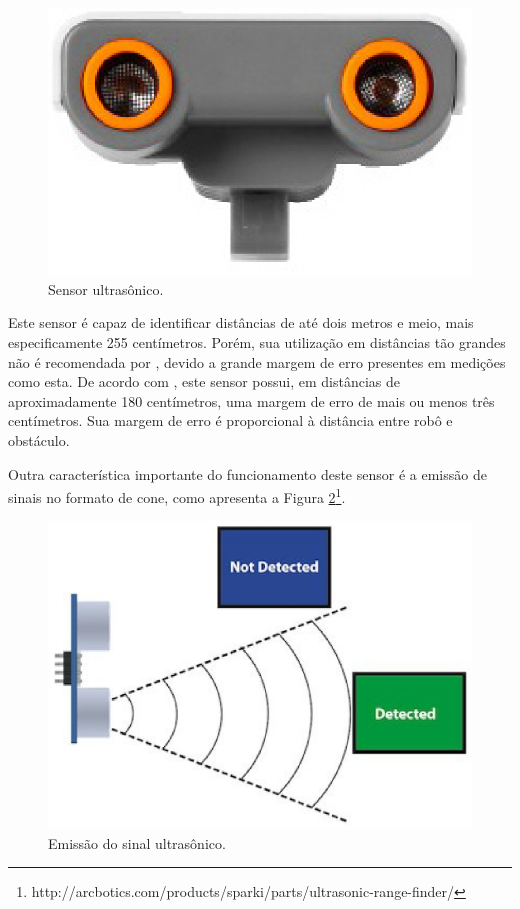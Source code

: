 \begin{itemize}
				\begin{figure}[H]
					\centering
					\includegraphics[scale=0.5]{figuras/ultrasonic.eps}
					\caption{Sensor ultrasônico.}
					\label{img:ultrasonic}
				\end{figure}

				Este sensor é capaz de identificar distâncias de até dois metros e meio, mais especificamente 255 centímetros. Porém, sua utilização em distâncias tão grandes não é recomendada por \cite{legonxj}, devido a grande margem de erro presentes em medições como esta. De acordo com \cite{legonxj}, este sensor possui, em distâncias de aproximadamente 180 centímetros, uma margem de erro de mais ou menos três centímetros. Sua margem de erro é proporcional à distância entre robô e obstáculo.

				Outra característica importante do funcionamento deste sensor é a emissão de sinais no formato de cone, como apresenta a Figura \ref{img:cone2}\footnote{http://arcbotics.com/products/sparki/parts/ultrasonic-range-finder/}.


				\begin{figure}[H]
					\centering
					\includegraphics[scale=0.7]{figuras/cone2.eps}
					\caption{Emissão do sinal ultrasônico.}
					\label{img:cone2}
				\end{figure}


\end{itemize}
